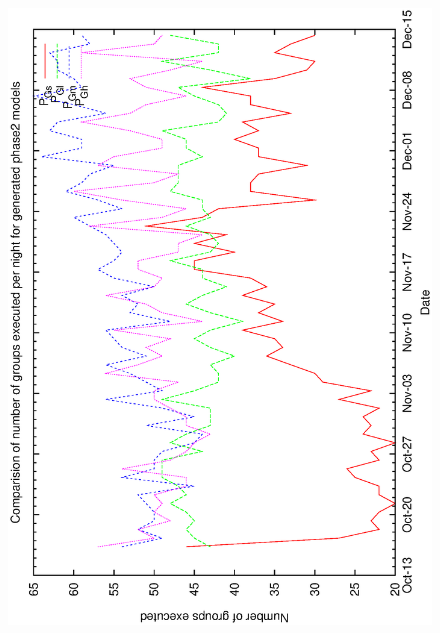 \begin{figure}[h]
\begin{center}
{   \includegraphics[scale=0.5, angle=-90]{figures/c60_gen_ng.eps}
  }
 \end{center}
\end{figure}

